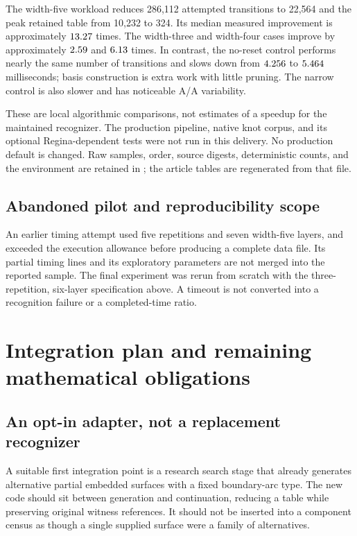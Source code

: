 \documentclass[11pt,letterpaper]{article}
\theoremstyle{definition}
\begin{document}
The width-five workload reduces 286,112 attempted transitions to 22,564 and the peak retained table from 10,232 to 324. Its median measured improvement is approximately $13.27$ times. The width-three and width-four cases improve by approximately $2.59$ and $6.13$ times. In contrast, the no-reset control performs nearly the same number of transitions and slows down from $4.256$ to $5.464$ milliseconds; basis construction is extra work with little pruning. The narrow control is also slower and has noticeable A/A variability.

These are local algorithmic comparisons, not estimates of a speedup for the maintained recognizer. The production pipeline, native knot corpus, and its optional Regina-dependent tests were not run in this delivery. No production default is changed. Raw samples, order, source digests, deterministic counts, and the environment are retained in ; the article tables are regenerated from that file.

\subsection{Abandoned pilot and reproducibility scope}
An earlier timing attempt used five repetitions and seven width-five layers, and exceeded the execution allowance before producing a complete data file. Its partial timing lines and its exploratory parameters are not merged into the reported sample. The final experiment was rerun from scratch with the three-repetition, six-layer specification above. A timeout is not converted into a recognition failure or a completed-time ratio.

\section{Integration plan and remaining mathematical obligations}
\subsection{An opt-in adapter, not a replacement recognizer}
A suitable first integration point is a research search stage that already generates alternative partial embedded surfaces with a fixed boundary-arc type. The new code should sit between generation and continuation, reducing a table while preserving original witness references. It should not be inserted into a component census as though a single supplied surface were a family of alternatives.
\end{document}
